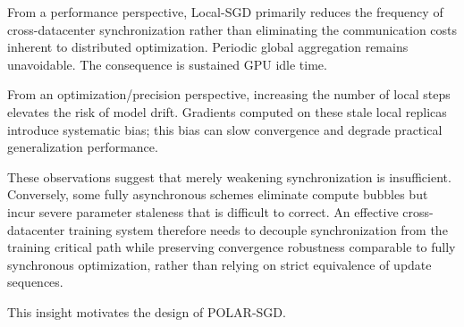 From a performance perspective, Local-SGD primarily reduces the frequency of cross-datacenter synchronization rather than eliminating the communication costs inherent to distributed optimization. Periodic global aggregation remains unavoidable. The consequence is sustained GPU idle time.

From an optimization/precision perspective, increasing the number of local steps elevates the risk of model drift. Gradients computed on these stale local replicas introduce systematic bias; this bias can slow convergence and degrade practical generalization performance.

These observations suggest that merely weakening synchronization is insufficient. Conversely, some fully asynchronous schemes\cite{DBLP:journals/corr/abs-2407-07852, DBLP:journals/corr/abs-2501-18512} eliminate compute bubbles but incur severe parameter staleness that is difficult to correct. An effective cross-datacenter training system therefore needs to decouple synchronization from the training critical path while preserving convergence robustness comparable to fully synchronous optimization, rather than relying on strict equivalence of update sequences.


This insight motivates the design of POLAR-SGD.
